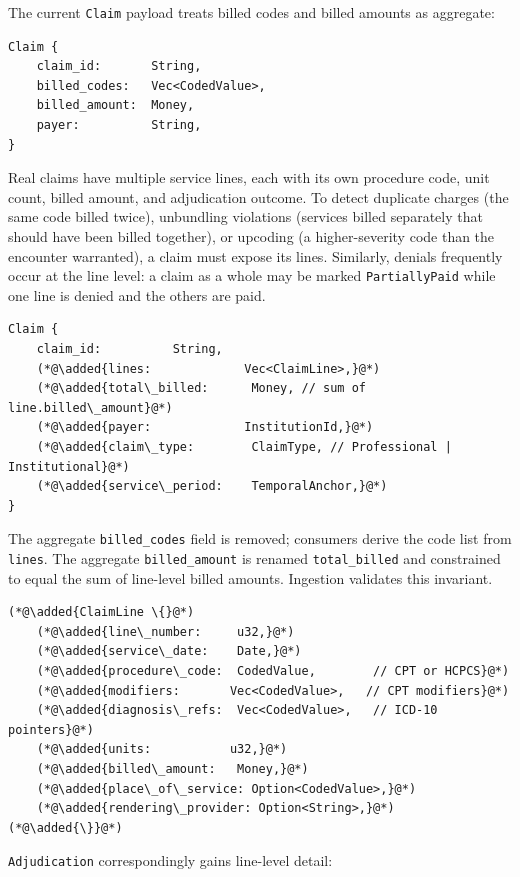 \documentclass[11pt]{article}
\newcommand{\added}[1]{\textcolor{accentblue}{#1}}
\begin{document}
The current \texttt{Claim} payload treats billed codes and billed amounts
as aggregate:

\begin{lstlisting}
Claim {
    claim_id:       String,
    billed_codes:   Vec<CodedValue>,
    billed_amount:  Money,
    payer:          String,
}
\end{lstlisting}

Real claims have multiple service lines, each with its own procedure
code, unit count, billed amount, and adjudication outcome. To detect
duplicate charges (the same code billed twice), unbundling violations
(services billed separately that should have been billed together), or
upcoding (a higher-severity code than the encounter warranted), a claim
must expose its lines. Similarly, denials frequently occur at the line
level: a claim as a whole may be marked \texttt{PartiallyPaid} while one
line is denied and the others are paid.

\begin{lstlisting}
Claim {
    claim_id:          String,
    (*@\added{lines:             Vec<ClaimLine>,}@*)
    (*@\added{total\_billed:      Money, // sum of line.billed\_amount}@*)
    (*@\added{payer:             InstitutionId,}@*)
    (*@\added{claim\_type:        ClaimType, // Professional | Institutional}@*)
    (*@\added{service\_period:    TemporalAnchor,}@*)
}
\end{lstlisting}

The aggregate \texttt{billed\_codes} field is removed; consumers derive
the code list from \texttt{lines}. The aggregate \texttt{billed\_amount}
is renamed \texttt{total\_billed} and constrained to equal the sum of
line-level billed amounts. Ingestion validates this invariant.

\begin{lstlisting}
(*@\added{ClaimLine \{}@*)
    (*@\added{line\_number:     u32,}@*)
    (*@\added{service\_date:    Date,}@*)
    (*@\added{procedure\_code:  CodedValue,        // CPT or HCPCS}@*)
    (*@\added{modifiers:       Vec<CodedValue>,   // CPT modifiers}@*)
    (*@\added{diagnosis\_refs:  Vec<CodedValue>,   // ICD-10 pointers}@*)
    (*@\added{units:           u32,}@*)
    (*@\added{billed\_amount:   Money,}@*)
    (*@\added{place\_of\_service: Option<CodedValue>,}@*)
    (*@\added{rendering\_provider: Option<String>,}@*)
(*@\added{\}}@*)
\end{lstlisting}

\texttt{Adjudication} correspondingly gains line-level detail:
\end{document}

